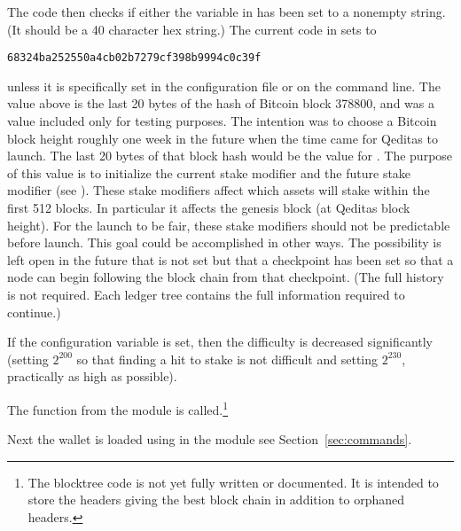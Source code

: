The code then checks if either the {} variable in {}
has been set to a nonempty string. (It should be a 40 character hex string.)
The current code in {} sets {} to
\begin{verbatim}
68324ba252550a4cb02b7279cf398b9994c0c39f
\end{verbatim}
unless it is specifically set in the configuration file or on the command line.
The value above is the last 20 bytes of the hash of Bitcoin block 378800,
and was a value included only for testing purposes.
The intention was to choose a Bitcoin block height roughly one week in the future
when the time came for Qeditas to launch. The last 20 bytes of that block hash would
be the value for {}. The purpose of this value is to initialize the
current stake modifier and the future stake modifier (see {}).
These stake modifiers affect which assets will stake within the first 512 blocks.
In particular it affects the genesis block (at Qeditas block height).
For the launch to be fair, these stake modifiers should not be predictable before launch.
This goal could be accomplished in other ways.
The possibility is left open in the future that {} is not set but
that a checkpoint has been set so that a node can begin following the block chain
from that checkpoint. (The full history is not required. Each ledger tree contains
the full information required to continue.)

If the {} configuration variable is set, then the difficulty is decreased significantly
(setting {} $2^{200}$ so that finding a hit to stake is not difficult
and setting {} $2^{230}$, practically as high as possible).

The function {} from the {} module
is called.\footnote{The blocktree code is not yet fully written or documented. It is intended to store the headers giving the best block chain in addition to orphaned headers.}

Next the wallet is loaded using {} in the {} module see Section~\ref{sec:commands}.

